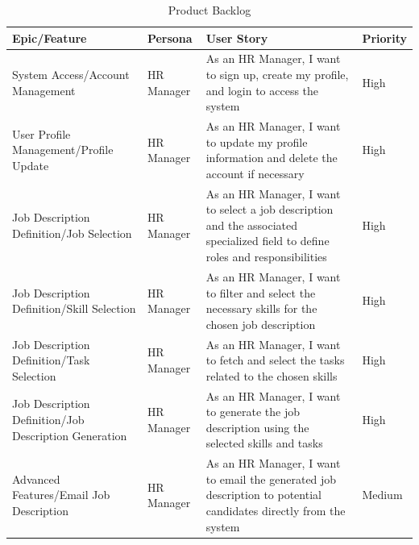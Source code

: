 \begin{table}[H]
    \renewcommand{\arraystretch}{1.5}%
    \caption{Product Backlog}
    \centering
    \medskip
    \small
    \begin{tabularx}{\textwidth} {
            | >{\hsize=1\hsize\raggedright\arraybackslash}X
            | >{\hsize=0.5\hsize\raggedright\arraybackslash}X
            | >{\hsize=2\hsize\raggedright\arraybackslash}X
            | >{\hsize=0.5\hsize\raggedright\arraybackslash}X |}
        \hline
        \rowcolor{primary} \textbf {Epic/Feature}             & \textbf {Persona} & \textbf {User Story}                                                                                                           & \textbf {Priority} \\
        \hline
        System Access/Account Management                      & HR Manager        & As an HR Manager, I want to sign up, create my profile, and login to access the system                                         & High               \\
        \hline
        User Profile Management/Profile Update                & HR Manager        & As an HR Manager, I want to update my profile information and delete the account if necessary                                  & High               \\
        \hline
        Job Description Definition/Job Selection              & HR Manager        & As an HR Manager, I want to select a job description and the associated specialized field to define roles and responsibilities & High               \\
        \hline
        Job Description Definition/Skill Selection            & HR Manager        & As an HR Manager, I want to filter and select the necessary skills for the chosen job description                              & High               \\
        \hline
        Job Description Definition/Task Selection             & HR Manager        & As an HR Manager, I want to fetch and select the tasks related to the chosen skills                                            & High               \\
        \hline
        Job Description Definition/Job Description Generation & HR Manager        & As an HR Manager, I want to generate the job description using the selected skills and tasks                                   & High               \\
        \hline
        Advanced Features/Email Job Description               & HR Manager        & As an HR Manager, I want to email the generated job description to potential candidates directly from the system               & Medium             \\

\end{tabularx}
\end{table}
